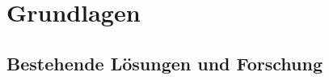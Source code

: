 \chapter{Grundlagen}
\label{chap:grundlagen}

\blindtext

\section{Bestehende Lösungen und Forschung}\label{sec:bestehende.forschung}

\blindtext    

